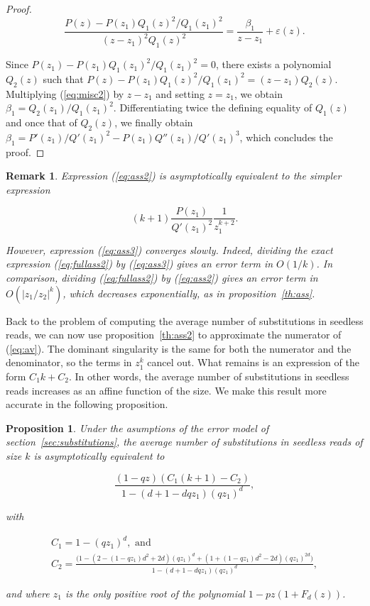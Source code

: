\documentclass{article}
\newtheorem{proposition}{Proposition}
\newtheorem{remark}{Remark}
\begin{document}
\begin{proof}
\begin{equation}
\label{eq:misc2}
\frac{P(z) - P(z_1)Q_1(z)^2/Q_1(z_1)^2}{(z-z_1)^2Q_1(z)^2} =
\frac{\beta_1}{z-z_1} + \varepsilon(z).
\end{equation}

Since $P(z_1) - P(z_1)Q_1(z_1)^2/Q_1(z_1)^2 = 0$, there exists a
polynomial $Q_2(z)$ such that $P(z) - P(z_1)Q_1(z)^2/Q_1(z_1)^2 =
(z-z_1)Q_2(z)$.  Multiplying (\ref{eq:misc2}) by $z-z_1$ and setting $z =
z_1$, we obtain $\beta_1 = Q_2(z_1)/Q_1(z_1)^2$. Differentiating twice the
defining equality of $Q_1(z)$ and once that of $Q_2(z)$, we finally obtain
$\beta_1 = P'(z_1)/Q'(z_1)^2 - P(z_1)Q''(z_1)/Q'(z_1)^3$, which concludes
the proof.
\end{proof}


\begin{remark}
Expression (\ref{eq:ass2}) is asymptotically equivalent to the simpler
expression

\begin{equation}
\label{eq:ass3}
(k+1)\frac{P(z_1)}{Q'(z_1)^2}\frac{1}{z_1^{k+2}}.
\end{equation}

However, expression (\ref{eq:ass3}) converges slowly. Indeed, dividing
the exact expression (\ref{eq:fullass2}) by (\ref{eq:ass3}) gives an error
term in $O(1/k)$. In comparison, dividing (\ref{eq:fullass2}) by
(\ref{eq:ass2}) gives an error term in $O(|z_1/z_2|^k)$, which decreases
exponentially, as in proposition~\ref{th:ass}.
\end{remark}




Back to the problem of computing the average number of substitutions in
seedless reads, we can now use proposition~\ref{th:ass2} to approximate
the numerator of (\ref{eq:av}). The dominant singularity is the same for
both the numerator and the denominator, so the terms in $z_1^k$ cancel
out. What remains is an expression of the form $C_1k + C_2$. In other
words, the average number of substitutions in seedless reads increases as
an affine function of the size. We make this result more accurate in the
following proposition.


\begin{proposition}
\label{th:avsub}
Under the asumptions of the error model of
section~\ref{sec:substitutions}, the average number of substitutions in
seedless reads of size $k$ is asymptotically equivalent to

\begin{equation*}
\frac{(1-qz)(C_1(k+1) - C_2)}{1-(d+1-dqz_1)(qz_1)^d},
\end{equation*}

\noindent
with

\begin{gather*}
C_1 = 1-(qz_1)^d, \text{ and} \\
C_2 = \frac{
\big(1-(2-(1-qz_1)d^2+2d)(qz_1)^d+(1+(1-qz_1)d^2-2d)(qz_1)^{2d} \big)}
{1-(d+1-dqz_1)(qz_1)^d},
\end{gather*}

\noindent
and where $z_1$ is the only positive root of the polynomial
$1-pz(1+F_d(z))$.
\end{proposition}
\end{document}
